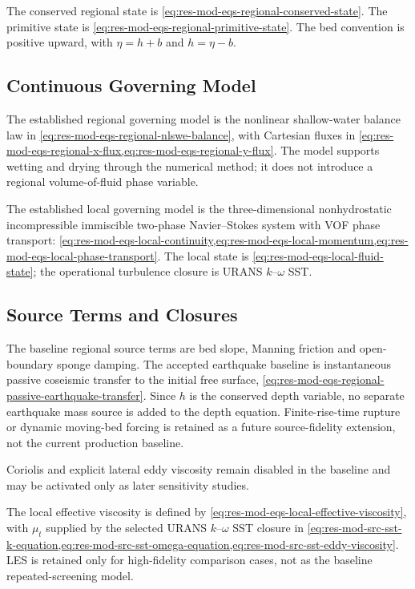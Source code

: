 The conserved regional state is
\cref{eq:res-mod-eqs-regional-conserved-state}. The primitive state is
\cref{eq:res-mod-eqs-regional-primitive-state}. The bed convention is
positive upward, with $\eta=h+b$ and $h=\eta-b$.

\subsection{Continuous Governing Model}
\label{sec:res-mod-spec-continuous-governing-model}

The established regional governing model is the nonlinear
shallow-water balance law in
\cref{eq:res-mod-eqs-regional-nlswe-balance}, with Cartesian fluxes in
\cref{eq:res-mod-eqs-regional-x-flux,eq:res-mod-eqs-regional-y-flux}.
The model supports wetting and drying through the numerical method; it
does not introduce a regional volume-of-fluid phase variable.

The established local governing model is the three-dimensional
nonhydrostatic incompressible immiscible two-phase Navier--Stokes
system with VOF phase transport:
\cref{eq:res-mod-eqs-local-continuity,eq:res-mod-eqs-local-momentum,eq:res-mod-eqs-local-phase-transport}.
The local state is
\cref{eq:res-mod-eqs-local-fluid-state}; the operational turbulence
closure is URANS $k$--$\omega$ SST.

\subsection{Source Terms and Closures}
\label{sec:res-mod-spec-source-terms-closures}

The baseline regional source terms are bed slope, Manning friction and
open-boundary sponge damping. The accepted earthquake baseline is
instantaneous passive coseismic transfer to the initial free surface,
\cref{eq:res-mod-eqs-regional-passive-earthquake-transfer}. Since $h$
is the conserved depth variable, no separate earthquake mass source is
added to the depth equation. Finite-rise-time rupture or dynamic
moving-bed forcing is retained as a future source-fidelity extension,
not the current production baseline.

Coriolis and explicit lateral eddy viscosity remain disabled in the
baseline and may be activated only as later sensitivity studies.

The local effective viscosity is defined by
\cref{eq:res-mod-eqs-local-effective-viscosity}, with $\mu_t$ supplied
by the selected URANS $k$--$\omega$ SST closure in
\cref{eq:res-mod-src-sst-k-equation,eq:res-mod-src-sst-omega-equation,eq:res-mod-src-sst-eddy-viscosity}.
LES is retained only for high-fidelity comparison cases, not as the
baseline repeated-screening model.

